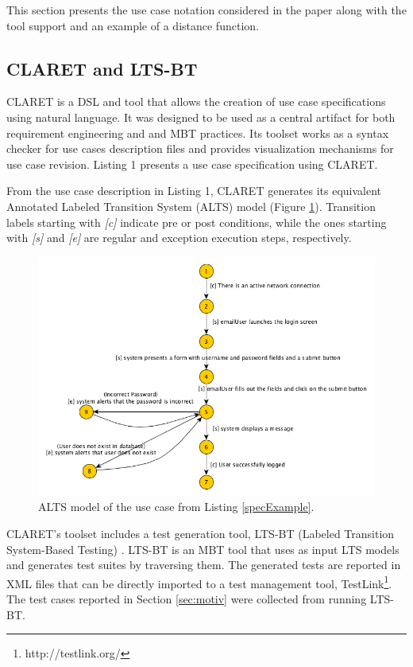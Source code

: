 This section presents the use case notation considered in the paper along with the tool support and an example of a distance function.

\subsection{CLARET and LTS-BT}
CLARET \cite{dalton2017claret,dalton2018mbtagile} is a DSL and tool that allows the creation of use case specifications using natural language. It was designed to be used as a central artifact for both requirement engineering and and MBT practices. Its toolset works as a syntax checker for use cases description files and provides
visualization mechanisms for use case revision. Listing 1 presents a use case specification using CLARET.  

From the use case description in Listing 1, CLARET generates its equivalent Annotated Labeled Transition System (ALTS) model \cite{tretmans2008model} (Figure \ref{fig:alts}). Transition labels starting with \textit{[c]} indicate pre or post conditions, while the ones starting with \textit{[s]} and \textit{[e]} are regular and exception execution steps, respectively.

\begin{figure}[h!] 
\centering 
\includegraphics[width=.5\textwidth]{figs/UserLogin.png}
\caption{ALTS model of the use case from Listing \ref{specExample}.}
\label{fig:alts}
\end{figure}

CLARET's toolset includes a test generation tool, LTS-BT (Labeled Transition System-Based Testing) \cite{cartaxo2008lts}. LTS-BT is an MBT tool that uses as input LTS models and generates test suites by traversing them. The generated tests are reported in XML files that can be directly imported to a test management tool, TestLink\footnote{http://testlink.org/}. 
The test cases reported in Section \ref{sec:motiv} were collected from running LTS-BT.

